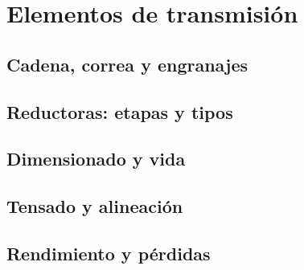\chapter{Elementos de transmisión}
\label{ch:elementos_transmision}

\begin{objetivos}
  \item {}
  \item {}
  \item {}
\end{objetivos}


\section{Cadena, correa y engranajes}
\label{sec:elementos_transmision:01}

\section{Reductoras: etapas y tipos}
\label{sec:elementos_transmision:02}

\section{Dimensionado y vida}
\label{sec:elementos_transmision:03}

\section{Tensado y alineación}
\label{sec:elementos_transmision:04}

\section{Rendimiento y pérdidas}
\label{sec:elementos_transmision:05}


